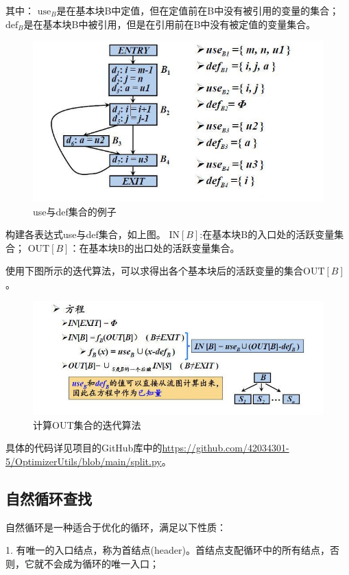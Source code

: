 \documentclass[cn,black,11pt,normal]{elegantnote}
\begin{document}
其中：
$\text{use}_B$是在基本块B中定值，但在定值前在B中没有被引用的变量的集合；
$\text{def}_B$是在基本块B中被引用，但是在引用前在B中没有被定值的变量集合。

\begin{figure}[H]
    \centering
    \includegraphics[width=0.8\linewidth]{image/activeV1.jpg}
    \caption{use与def集合的例子}
\end{figure}

构建各表达式use与def集合，如上图。
$\text{IN}[B]$:在基本块B的入口处的活跃变量集合；
$\text{OUT}[B]$：在基本块B的出口处的活跃变量集合。

使用下图所示的迭代算法，可以求得出各个基本块后的活跃变量的集合$\text{OUT}[B]$。

\begin{figure}[H]
    \centering
    \includegraphics[width=0.8\linewidth]{image/activeV2.jpg}
    \caption{计算OUT集合的迭代算法}
\end{figure}

具体的代码详见项目的GitHub库中的\url{https://github.com/42034301-5/OptimizerUtils/blob/main/split.py}。

\subsection{自然循环查找}

自然循环是一种适合于优化的循环，满足以下性质：

1. 有唯一的入口结点，称为首结点(header)。首结点支配循环中的所有结点，否则，它就不会成为循环的唯一入口；
\end{document}
